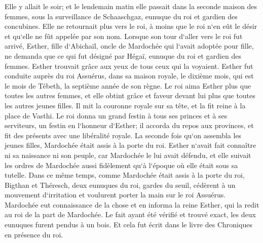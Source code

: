 \verse Elle y allait le soir; et le lendemain matin elle passait dans la seconde maison des femmes, sous la surveillance de Schaaschgaz, eunuque du roi et gardien des concubines. Elle ne retournait plus vers le roi, à moins que le roi n`en eût le désir et qu`elle ne fût appelée par son nom. 
\verse Lorsque son tour d`aller vers le roi fut arrivé, Esther, fille d`Abichaïl, oncle de Mardochée qui l`avait adoptée pour fille, ne demanda que ce qui fut désigné par Hégaï, eunuque du roi et gardien des femmes. Esther trouvait grâce aux yeux de tous ceux qui la voyaient. 
\verse Esther fut conduite auprès du roi Assuérus, dans sa maison royale, le dixième mois, qui est le mois de Tébeth, la septième année de son règne. 
\verse Le roi aima Esther plus que toutes les autres femmes, et elle obtint grâce et faveur devant lui plus que toutes les autres jeunes filles. Il mit la couronne royale sur sa tête, et la fit reine à la place de Vasthi. 
\verse Le roi donna un grand festin à tous ses princes et à ses serviteurs, un festin en l`honneur d`Esther; il accorda du repos aux provinces, et fit des présents avec une libéralité royale. 
\verse La seconde fois qu`on assembla les jeunes filles, Mardochée était assis à la porte du roi. 
\verse Esther n`avait fait connaître ni sa naissance ni son peuple, car Mardochée le lui avait défendu, et elle suivait les ordres de Mardochée aussi fidèlement qu`à l`époque où elle était sous sa tutelle. 
\verse Dans ce même temps, comme Mardochée était assis à la porte du roi, Bigthan et Théresch, deux eunuques du roi, gardes du seuil, cédèrent à un mouvement d`irritation et voulurent porter la main sur le roi Assuérus. 
\verse Mardochée eut connaissance de la chose et en informa la reine Esther, qui la redit au roi de la part de Mardochée. 
\verse Le fait ayant été vérifié et trouvé exact, les deux eunuques furent pendus à un bois. Et cela fut écrit dans le livre des Chroniques en présence du roi. 

\chapter{}

